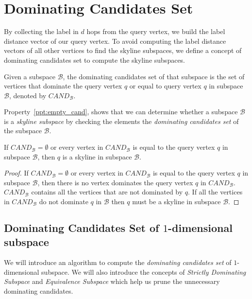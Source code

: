 \section{Dominating Candidates Set}
\label{sec:bfs-collect}

By collecting the label in $d$ hops from the query vertex, we build the label distance vector of our query vertex. To avoid computing the label distance vectors of all other vertices to find the skyline subspaces, we define a concept of dominating candidates set to compute the skyline subspaces.

\begin{definition}
Given a subspace $\mathcal{B}$, the dominating candidates set of that subspace is the set of vertices that dominate the query vertex $q$ or equal to query vertex $q$ in subspace $\mathcal{B}$, denoted by $\mathit{CAND}_\mathcal{B}$.
\end{definition}

Property~\ref{ppt:empty_cand}, shows that we can determine whether a subspace $\mathcal{B}$ is a \emph{skyline subspace} by checking the elements the \emph{dominating candidates set} of the subspace $\mathcal{B}$.

\begin{property}
\label{ppt:empty_cand}
If $\mathit{CAND}_\mathcal{B} = \emptyset$ or every vertex in $\mathit{CAND}_\mathcal{B}$ is equal to the query vertex $q$ in subspace $\mathcal{B}$, then $q$ is a skyline in subspace $\mathcal{B}$.
\end{property}

\begin{proof}
If $\mathit{CAND}_\mathcal{B} = \emptyset$ or every vertex in $\mathit{CAND}_\mathcal{B}$ is equal to the query vertex $q$ in subspace $\mathcal{B}$, then there is no vertex dominates the query vertex $q$ in $\mathit{CAND}_\mathcal{B}$.
$\mathit{CAND}_\mathcal{B}$ contains all the vertices that are not dominated by $q$. If all the vertices in $\mathit{CAND}_\mathcal{B}$ do not dominate $q$ in $\mathcal{B}$ then $q$ must be a skyline in subspace $\mathcal{B}$.
\end{proof}

\subsection{Dominating Candidates Set of $1$-dimensional subspace}

We will introduce an algorithm to compute the \emph{dominating candidates set} of $1$-dimensional subspace. We will also introduce the concepts of \emph{Strictly Dominating Subspace} and \emph{Equivalence Subspace} which help us prune the unnecessary dominating candidates.


